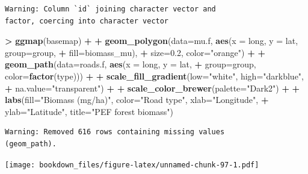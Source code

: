 \documentclass[]{krantz}
\makeatletter
\newenvironment{Shaded}{\begin{snugshade}}{\end{snugshade}}
\newcommand{\KeywordTok}[1]{\textcolor[rgb]{0.27,0.27,0.27}{\textbf{#1}}}
\newcommand{\DataTypeTok}[1]{\textcolor[rgb]{0.27,0.27,0.27}{#1}}
\newcommand{\FloatTok}[1]{\textcolor[rgb]{0.06,0.06,0.06}{#1}}
\newcommand{\StringTok}[1]{\textcolor[rgb]{0.5,0.5,0.5}{#1}}
\newcommand{\OperatorTok}[1]{\textcolor[rgb]{0.43,0.43,0.43}{\textbf{#1}}}
\newcommand{\NormalTok}[1]{#1}
\newenvironment{kframe}{%
\medskip{}
\setlength{\fboxsep}{.8em}
 \def\at@end@of@kframe{}%
 \ifinner\ifhmode%
  \def\at@end@of@kframe{\end{minipage}}%
  \begin{minipage}{\columnwidth}%
 \fi\fi%
 \def\FrameCommand##1{\hskip\@totalleftmargin \hskip-\fboxsep
 \colorbox{shadecolor}{##1}\hskip-\fboxsep
     \hskip-\linewidth \hskip-\@totalleftmargin \hskip\columnwidth}%
 \MakeFramed {\advance\hsize-\width
   \@totalleftmargin\z@ \linewidth\hsize
   \@setminipage}}%
 {\par\unskip\endMakeFramed%
 \at@end@of@kframe}
\renewenvironment{Shaded}{\begin{kframe}}{\end{kframe}}
\theoremstyle{definition}
\theoremstyle{definition}
\theoremstyle{definition}
\theoremstyle{remark}
\makeatother
\begin{document}
\begin{verbatim}
Warning: Column `id` joining character vector and
factor, coercing into character vector
\end{verbatim}

\begin{Shaded}
\begin{Highlighting}[]
\OperatorTok{>}\StringTok{ }\KeywordTok{ggmap}\NormalTok{(basemap) }\OperatorTok{+}
\OperatorTok{+}\StringTok{     }\KeywordTok{geom_polygon}\NormalTok{(}\DataTypeTok{data=}\NormalTok{mu.f, }\KeywordTok{aes}\NormalTok{(}\DataTypeTok{x =}\NormalTok{ long, }\DataTypeTok{y =}\NormalTok{ lat, }\DataTypeTok{group=}\NormalTok{group, }
\OperatorTok{+}\StringTok{                                 }\DataTypeTok{fill=}\NormalTok{biomass_mu), }
\OperatorTok{+}\StringTok{                  }\DataTypeTok{size=}\FloatTok{0.2}\NormalTok{, }\DataTypeTok{color=}\StringTok{"orange"}\NormalTok{) }\OperatorTok{+}
\OperatorTok{+}\StringTok{     }\KeywordTok{geom_path}\NormalTok{(}\DataTypeTok{data=}\NormalTok{roads.f, }\KeywordTok{aes}\NormalTok{(}\DataTypeTok{x =}\NormalTok{ long, }\DataTypeTok{y =}\NormalTok{ lat, }
\OperatorTok{+}\StringTok{                                 }\DataTypeTok{group=}\NormalTok{group, }\DataTypeTok{color=}\KeywordTok{factor}\NormalTok{(type))) }\OperatorTok{+}
\OperatorTok{+}\StringTok{     }\KeywordTok{scale_fill_gradient}\NormalTok{(}\DataTypeTok{low=}\StringTok{"white"}\NormalTok{, }\DataTypeTok{high=}\StringTok{"darkblue"}\NormalTok{, }
\OperatorTok{+}\StringTok{                         }\DataTypeTok{na.value=}\StringTok{"transparent"}\NormalTok{) }\OperatorTok{+}
\OperatorTok{+}\StringTok{     }\KeywordTok{scale_color_brewer}\NormalTok{(}\DataTypeTok{palette=}\StringTok{"Dark2"}\NormalTok{) }\OperatorTok{+}
\OperatorTok{+}\StringTok{     }\KeywordTok{labs}\NormalTok{(}\DataTypeTok{fill=}\StringTok{"Biomass (mg/ha)"}\NormalTok{, }\DataTypeTok{color=}\StringTok{"Road type"}\NormalTok{, }\DataTypeTok{xlab=}\StringTok{"Longitude"}\NormalTok{, }
\OperatorTok{+}\StringTok{          }\DataTypeTok{ylab=}\StringTok{"Latitude"}\NormalTok{, }\DataTypeTok{title=}\StringTok{"PEF forest biomass"}\NormalTok{)}
\end{Highlighting}
\end{Shaded}

\begin{verbatim}
Warning: Removed 616 rows containing missing values
(geom_path).
\end{verbatim}

\texttt{[image: bookdown\_files/figure-latex/unnamed-chunk-97-1.pdf]}
\end{document}
